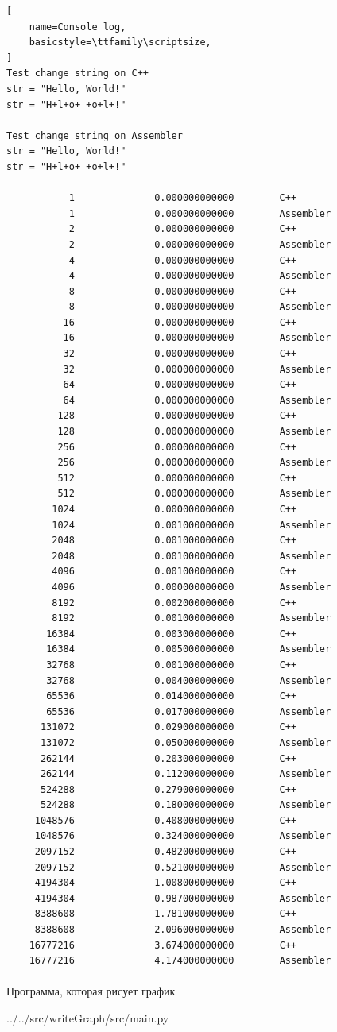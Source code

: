 \begin{lstlisting}[
    name=Console log,
    basicstyle=\ttfamily\scriptsize,
]
Test change string on C++
str = "Hello, World!"
str = "H+l+o+ +o+l+!"

Test change string on Assembler
str = "Hello, World!"
str = "H+l+o+ +o+l+!"

           1              0.000000000000        C++
           1              0.000000000000        Assembler
           2              0.000000000000        C++
           2              0.000000000000        Assembler
           4              0.000000000000        C++
           4              0.000000000000        Assembler
           8              0.000000000000        C++
           8              0.000000000000        Assembler
          16              0.000000000000        C++
          16              0.000000000000        Assembler
          32              0.000000000000        C++
          32              0.000000000000        Assembler
          64              0.000000000000        C++
          64              0.000000000000        Assembler
         128              0.000000000000        C++
         128              0.000000000000        Assembler
         256              0.000000000000        C++
         256              0.000000000000        Assembler
         512              0.000000000000        C++
         512              0.000000000000        Assembler
        1024              0.000000000000        C++
        1024              0.001000000000        Assembler
        2048              0.001000000000        C++
        2048              0.001000000000        Assembler
        4096              0.001000000000        C++
        4096              0.000000000000        Assembler
        8192              0.002000000000        C++
        8192              0.001000000000        Assembler
       16384              0.003000000000        C++
       16384              0.005000000000        Assembler
       32768              0.001000000000        C++
       32768              0.004000000000        Assembler
       65536              0.014000000000        C++
       65536              0.017000000000        Assembler
      131072              0.029000000000        C++
      131072              0.050000000000        Assembler
      262144              0.203000000000        C++
      262144              0.112000000000        Assembler
      524288              0.279000000000        C++
      524288              0.180000000000        Assembler
     1048576              0.408000000000        C++
     1048576              0.324000000000        Assembler
     2097152              0.482000000000        C++
     2097152              0.521000000000        Assembler
     4194304              1.008000000000        C++
     4194304              0.987000000000        Assembler
     8388608              1.781000000000        C++
     8388608              2.096000000000        Assembler
    16777216              3.674000000000        C++
    16777216              4.174000000000        Assembler
\end{lstlisting}

\newpage

\paragraph{} Программа, которая рисует график


{../../src/writeGraph/src/main.py}
